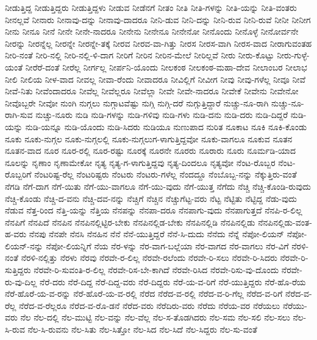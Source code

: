{ನೀಡುತ್ತಿದ್ದ
ನೀಡುತ್ತಿದ್ದರು
ನೀಡುತ್ತಿದ್ದಳು
ನೀಡುವ
ನೀಡೆನಗೆ
ನೀತಂ
ನೀತಿ
ನೀತಿ-ಗಳನ್ನು
ನೀತಿ-ಯನ್ನು
ನೀತಿ-ವಂತರು
ನೀನಲ್ಲವೆ
ನೀನಾರು
ನೀನಾವು-ದನ್ನು
ನೀನಾವು-ದಾದರೂ
ನೀನಿ-ಡುವ
ನೀನಿ-ದನ್ನು
ನೀನಿ-ರುವ
ನೀನಿ-ರುವೆ
ನೀನೀ
ನೀನೀಗ
ನೀನು
ನೀನೂ
ನೀನೆ
ನೀನೇ
ನೀನೇ-ನಾದರೂ
ನೀನೇನು
ನೀನೇನೂ
ನೀನೇನೋ
ನೀನೊಂದು
ನೀನೊಳ್ಳೆ
ನೀನೋರ್ವನೇ
ನೀರನ್ನು
ನೀರನ್ನೆಲ್ಲ
ನೀರನ್ನೇ
ನೀರನ್ನೇ-ತಕ್ಕೆ
ನೀರವ
ನೀರವ-ವಾ-ಗಿತ್ತು
ನೀರಸ
ನೀರಸ-ವಾಗಿ
ನೀರಸ-ವಾದ
ನೀರಾಗುವಂತಹ
ನೀರಿ-ನಂತೆ
ನೀರಿ-ನಲ್ಲಿ
ನೀರಿ-ನಲ್ಲಿ-ಳಿ-ದಾಗ
ನೀರಿಗೆ
ನೀರಿನ
ನೀರಿನ-ಮೇಲೆ
ನೀರಿಲ್ಲವೆ
ನೀರು
ನೀರು-ಕೊಟ್ಟು
ನೀರು-ಗುಳ್ಳೆ-ಯಂತೆ
ನೀರೆರೆ-ದಂತೆ
ನೀರೆಲ್ಲ
ನೀರ್ಗಲ್ಲ
ನೀರ್ಪನಿ-ಯೊಂದು
ನೀಲಕಂಠ
ನೀಲಕಂಠ-ಮಹಾ-ದೇವ
ನೀಲಾಂಬರ
ನೀಲಾಭ
ನೀಲಿ
ನೀಲಿಯ
ನೀಳ-ವಾದ
ನೀವಲ್ಲ
ನೀವಾ-ರೆಂದು
ನೀವಾದರೂ
ನೀವಿಲ್ಲಿಗೆ
ನೀವೀಗ
ನೀವು
ನೀವು-ಗಳೆಲ್ಲ
ನೀವೂ
ನೀವೆ
ನೀವೆ-ನಿತು
ನೀವೆಂದಾದರೂ
ನೀವೆಲ್ಲ
ನೀವೆಲ್ಲರೂ
ನೀವೆಲ್ಲಾ
ನೀವೇ
ನೀವೇ-ನಾದರೂ
ನೀವೇಕೆ
ನೀವೇನು
ನೀವೇನೋ
ನೀವೊಬ್ಬರೇ
ನೀವೋ
ನುಂಗಿ
ನುಗ್ಗಲು
ನುಗ್ಗಾಟವೆಷ್ಟು
ನುಗ್ಗಿ
ನುಗ್ಗಿ-ದರೆ
ನುಗ್ಗುತ್ತಿದ್ದಾರೆ
ನುಚ್ಚು-ನೂ-ರಾಗಿ
ನುಚ್ಚು-ನೂ-ರಾಗಿ-ಸುವ
ನುಚ್ಚು-ನೂರು
ನುಡಿ
ನುಡಿ-ಗಳನ್ನು
ನುಡಿ-ಗಳಿವು
ನುಡಿ-ಗಳು
ನುಡಿ-ದನು
ನುಡಿ-ದರು
ನುಡಿ-ದಿದ್ದರೆ
ನುಡಿ-ಯನ್ನು
ನುಡಿ-ಯನ್ನೂ
ನುಡಿ-ಯೊಂದು
ನುಡಿ-ಸಿದರು
ನುಡಿಯೂ
ನುಣುಪಾದ
ನುರಿತ
ನೂಕಾಟ
ನೂಕಿ
ನೂಕಿ-ಕೊಂಡು
ನೂಕು
ನೂಕು-ನುಗ್ಗಲ
ನೂಕು-ನುಗ್ಗಲಲ್ಲಿ
ನೂಕು-ನುಗ್ಗಲುಗ-ಳಾಗುತ್ತಿದ್ದವೋ
ನೂಕು-ವಾಗಲೂ
ನೂಕುವ
ನೂತನ
ನೂತನ-ವಾದ
ನೂರ
ನೂರ-ರಲ್ಲಿ
ನೂರ-ರಷ್ಟು
ನೂರಕ್ಕೆ
ನೂರನೇ
ನೂರರು
ನೂರಾರು
ನೂರು
ನೂರ್ಮಡಿ-ಯಾದ
ನೂಲನ್ನು
ನೃಣಾಂ
ನೃಣಾಮೇಕೋ
ನೃತ್ಯ
ನೃತ್ಯ-ಗ-ಳಾಗುತ್ತಿದ್ದವು
ನೃತ್ಯ-ದಿಂದಲೂ
ನೃತ್ಯವೋ
ನೆಂಟ-ರೊಬ್ಬರ
ನೆಂಟ-ರೊಬ್ಬರಿಗೆ
ನೆಂಟರಿಷ್ಟ-ರೆಲ್ಲ
ನೆಂಟರಿಷ್ಟರು
ನೆಂಟರು
ನೆಂಟರು-ಗಳೆಲ್ಲ
ನೆಂದದ್ದೂ
ನೆಂಬೊಬ್ಬ-ನನ್ನು
ನೆಕ್ಕುತ್ತಿರು-ವಂತೆ
ನೆಗಡಿ
ನೆಗೆ-ದಾಗ
ನೆಗೆ-ಯಿತು
ನೆಗೆ-ಯು-ವಾಗಲೂ
ನೆಗೆ-ಯು-ವುದು
ನೆಗೆ-ಯುತ್ತ
ನೆಗೆದು
ನೆಚ್ಚಿ
ನೆಚ್ಚಿ-ಕೊಂಡಿ-ರುವುದು
ನೆಚ್ಚಿ-ಕೊಂಡು
ನೆಚ್ಚಿ-ದ-ವನು
ನೆಚ್ಚಿ-ದವ-ನನ್ನು
ನೆಚ್ಚಿಗೆ
ನೆಚ್ಚಿನ
ನೆಚ್ಚುಗೆಟ್ಟ-ವರು
ನೆಟ್ಟ
ನೆಟ್ಟಿತು
ನೆಟ್ಟಿದ್ದ
ನೆಡು-ವುದು
ನೆಡುವ
ನೆತ್ತ-ರಿಂದ
ನೆತ್ತಿ-ಯನ್ನು
ನೆತ್ತಿಯ
ನೆನಪನ್ನು
ನೆನಪಾ-ದರೂ
ನೆನಪಾಗು-ವುದು
ನೆನಪಾಗುತ್ತದೆ
ನೆನಪಿ-ರ-ಲಿಲ್ಲ
ನೆನಪಿಗೆ
ನೆನಪಿದೆ
ನೆನಪಿನ
ನೆನಪಿನಲ್ಲಿಟ್ಟಿರ-ಬೇಕು
ನೆನಪಿನಲ್ಲಿಡ-ಬೇಕು
ನೆನಪಿನಲ್ಲಿಡಿ
ನೆನಪಿನಲ್ಲಿಡು
ನೆನಪಿನಲ್ಲಿಡು-ವಂತ-ಹ-ವರು
ನೆನಪು
ನೆನಪೇ
ನೆನಸಿ
ನೆನಹಿನ
ನೆನೆ
ನೆನೆ-ಯುತ್ತಿದ್ದರೆ
ನೆನೆ-ಸಿ-ದುದು
ನೆನೆದು
ನೆನ್ನೆ
ನೆಪೋ-ಲಿಯನ್
ನೆಪೋ-ಲಿಯನ್-ನನ್ನು
ನೆಪೋ-ಲಿಯನ್ನಿಗೆ
ನೆಯ
ನೆರ-ಳನ್ನು
ನೆರ-ವಾಗ-ಬಲ್ಲೆಯಾ
ನೆರ-ವಾಗದ
ನೆರ-ವಾಗಲು
ನೆರ-ವಿಗೆ
ನೆರಳಿ-ನಂತೆ
ನೆರಳಿ-ನಲ್ಲಿತ್ತು
ನೆರಳು
ನೆರವು
ನೆರವೇ-ರ-ಲಿಲ್ಲ
ನೆರವೇ-ರಲೆಂದು
ನೆರವೇ-ರಿ-ಸಲು
ನೆರವೇ-ರಿ-ಸಿದರು
ನೆರವೇ-ರಿ-ಸುತ್ತಿದ್ದರು
ನೆರವೇ-ರಿ-ಸುವಂತಿ-ರ-ಲಿಲ್ಲ
ನೆರವೇ-ರಿಸ-ಬೇ-ಕಾಗಿದೆ
ನೆರವೇ-ರಿಸಿದ
ನೆರವೇ-ರಿಸು-ವು-ದೊಂದು
ನೆರವೇ-ರು-ವು-ದಿಲ್ಲ
ನೆರೆ-ದರು
ನೆರೆ-ದಿದ್ದ
ನೆರೆ-ದಿದ್ದ-ವರು
ನೆರೆ-ದಿದ್ದರು
ನೆರೆ-ಯ-ವ-ರಿಗೆ
ನೆರೆ-ಯುತ್ತಿದ್ದರು
ನೆರೆ-ಹೊ-ರೆಯ
ನೆರೆ-ಹೊರೆ-ಯ-ವ-ರನ್ನು
ನೆರೆ-ಹೊರೆ-ಯ-ವ-ರಲ್ಲಿ
ನೆರೆದ
ನೆರೆದ-ವ-ರಲ್ಲಿ
ನೆರೆದ-ವ-ರಿ-ಗೆಲ್ಲ
ನೆರೆದ-ವ-ರಿಗೆ
ನೆರೆದ-ವ-ರೆಲ್ಲ
ನೆರೆದ-ವ-ರೆಲ್ಲರೂ
ನೆರೆದ-ವ-ರೊ-ಡನೆ
ನೆರೆದ-ವರು
ನೆರೆದಿರು-ವರು
ನೆರೆದು
ನೆರೆಯ-ವರ
ನೆರೆಯಲು
ನೆರೆಯು-ವರು
ನೆಲ
ನೆಲ-ದಲ್ಲಿ
ನೆಲ-ಮುಟ್ಟಿ
ನೆಲ-ವನ್ನು
ನೆಲ-ವೆಲ್ಲ
ನೆಲ-ಸ-ತೊಡಗಿದರು
ನೆಲ-ಸಮ
ನೆಲ-ಸಲಿ
ನೆಲ-ಸಲು
ನೆಲ-ಸಿ-ರುವ
ನೆಲ-ಸಿ-ರುವನು
ನೆಲ-ಸಿತು
ನೆಲ-ಸಿತ್ತೋ
ನೆಲ-ಸಿದ
ನೆಲ-ಸಿದೆ
ನೆಲ-ಸಿದ್ದರು
ನೆಲ-ಸು-ವಂತೆ
}
